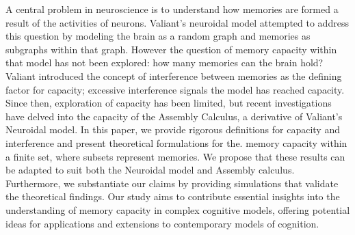 A central problem in neuroscience is to understand how memories are formed a result of the activities of neurons. Valiant’s neuroidal model attempted to address this question by modeling the brain as a random graph and memories as subgraphs within that graph. However the question of memory capacity within that model has not been explored: how many memories can the brain hold? Valiant introduced the concept of interference between memories as the defining factor for capacity; excessive interference signals the model has reached capacity. Since then, exploration of capacity has been limited, but recent investigations have delved into the capacity of the Assembly Calculus, a derivative of Valiant's Neuroidal model. In this paper, we provide rigorous definitions for capacity and interference and present theoretical formulations for the. memory capacity within a finite set, where subsets represent memories. We propose that these results can be adapted to suit both the Neuroidal model and Assembly calculus. Furthermore, we substantiate our claims by providing simulations that validate the theoretical findings. Our study aims to contribute essential insights into the understanding of memory capacity in complex cognitive models, offering potential ideas for applications and extensions to contemporary models of cognition.